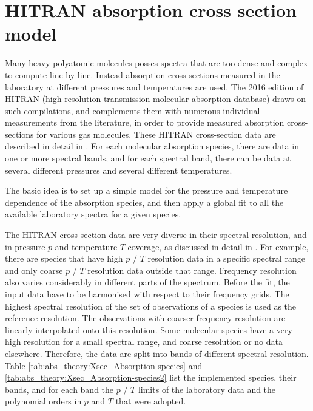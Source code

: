 \section{HITRAN absorption cross section model}
\label{sec:abs_theory:HITRAN_cross_section}

Many heavy polyatomic molecules posses spectra that are too dense and 
complex to compute line-by-line. Instead absorption cross-sections
measured in the laboratory at different pressures and temperatures are used.
The 2016 edition of HITRAN (high-resolution transmission molecular absorption database) draws on
such compilations, and complements them with numerous individual
measurements from the literature, in order to provide measured
absorption cross-sections for various gas molecules.
These HITRAN cross-section data are described in detail in 
\cite{gordon17:_hitran2016_jqsrt}.   For each molecular absorption species, 
there are data in one or more spectral bands, and for each spectral band, there can be data at
several different pressures and several different temperatures.

The basic idea is to set up a simple model for the pressure and
temperature dependence of the absorption species, and then apply a
global fit to all the available laboratory spectra for a given
species. 

The HITRAN cross-section data are very diverse in their spectral
resolution, and in pressure $p$  and temperature $T$ coverage, as discussed in detail in
\cite{kochanov19:_infrared_jqsrt}. For example, there
are species that have high $p$ / $T$ resolution data in a specific
spectral range and only coarse $p$ / $T$ resolution data outside that
range. Frequency resolution also varies considerably in different
parts of the spectrum.
Before the fit, the input data have to be harmonised with
respect to their frequency grids.  The highest spectral resolution 
of the set of observations of a species is used as the reference resolution. 
The observations with coarser frequency resolution are linearly interpolated onto this
resolution.
Some molecular species have a very high resolution for a small
spectral range, and coarse resolution or no data elsewhere.
Therefore, the data are split into bands of different
spectral resolution. Table \ref{tab:abs_theory:Xsec_Absorption-species} and 
\ref{tab:abs_theory:Xsec_Absorption-species2} list the implemented species, their bands, 
and for each band the $p$ / $T$ limits of the laboratory data and the 
polynomial orders in $p$ and $T$ that were adopted.

